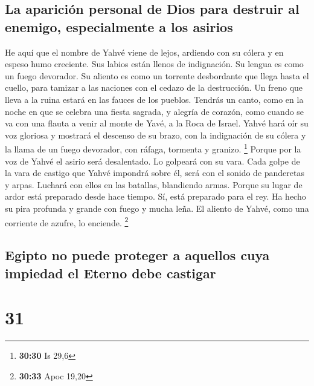 \hypertarget{la-apariciuxf3n-personal-de-dios-para-destruir-al-enemigo-especialmente-a-los-asirios}{%
\subsection{La aparición personal de Dios para destruir al enemigo,
especialmente a los
asirios}\label{la-apariciuxf3n-personal-de-dios-para-destruir-al-enemigo-especialmente-a-los-asirios}}

 He aquí que el nombre de Yahvé viene de lejos, ardiendo
con su cólera y en espeso humo creciente. Sus labios están llenos de
indignación. Su lengua es como un fuego devorador.  Su
aliento es como un torrente desbordante que llega hasta el cuello, para
tamizar a las naciones con el cedazo de la destrucción. Un freno que
lleva a la ruina estará en las fauces de los pueblos. 
Tendrás un canto, como en la noche en que se celebra una fiesta sagrada,
y alegría de corazón, como cuando se va con una flauta a venir al monte
de Yavé, a la Roca de Israel.  Yahvé hará oír su voz
gloriosa y mostrará el descenso de su brazo, con la indignación de su
cólera y la llama de un fuego devorador, con ráfaga, tormenta y granizo.
\footnote{\textbf{30:30} Is 29,6}  Porque por la voz de
Yahvé el asirio será desalentado. Lo golpeará con su vara.
 Cada golpe de la vara de castigo que Yahvé impondrá
sobre él, será con el sonido de panderetas y arpas. Luchará con ellos en
las batallas, blandiendo armas.  Porque su lugar de ardor
está preparado desde hace tiempo. Sí, está preparado para el rey. Ha
hecho su pira profunda y grande con fuego y mucha leña. El aliento de
Yahvé, como una corriente de azufre, lo enciende. \footnote{\textbf{30:33}
  Apoc 19,20}

\hypertarget{egipto-no-puede-proteger-a-aquellos-cuya-impiedad-el-eterno-debe-castigar}{%
\subsection{Egipto no puede proteger a aquellos cuya impiedad el Eterno
debe
castigar}\label{egipto-no-puede-proteger-a-aquellos-cuya-impiedad-el-eterno-debe-castigar}}

\hypertarget{section-30}{%
\section{31}\label{section-30}}

